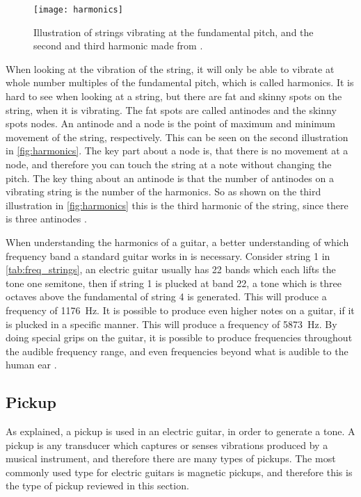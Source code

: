 \begin{figure}[H]
	\centering
	\texttt{[image: harmonics]}
	\caption{Illustration of strings vibrating at the fundamental pitch, and the second and third harmonic made from \citep{pickup}.}
	\label{fig:harmonics}
\end{figure}

When looking at the vibration of the string, it will only be able to vibrate at whole number multiples of the fundamental pitch, which is called harmonics. It is hard to see when looking at a string, but there are fat and skinny spots on the string, when it is vibrating. The fat spots are called antinodes and the skinny spots nodes. An antinode and a node is the point of maximum and minimum movement of the string, respectively. This can be seen on the second illustration in \autoref{fig:harmonics}. The key part about a node is, that there is no movement at a node, and therefore you can touch the string at a note without changing the pitch. The key thing about an antinode is that the number of antinodes on a vibrating string is the number of the harmonics. So as shown on the third illustration in \autoref{fig:harmonics} this is the third harmonic of the string, since there is three antinodes \citep{pickup}.

When understanding the harmonics of a guitar, a better understanding of which frequency band a standard guitar works in is necessary. Consider string 1 in \autoref{tab:freq_strings}, an electric guitar usually has 22 bands which each lifts the tone one semitone, then if string 1 is plucked at band 22, a tone which is three octaves above the fundamental of string 4 is generated. This will produce a frequency of \SI{1176}{\hertz}. It is possible to produce even higher notes on a guitar, if it is plucked in a specific manner. This will produce a frequency of \SI{5873}{\hertz}. By doing special grips on the guitar, it is possible to produce frequencies throughout the audible frequency range, and even frequencies beyond what is audible to the human ear \citep{high_note}. 

\subsection{Pickup}
As explained, a pickup is used in an electric guitar, in order to generate a tone. A pickup is any transducer which captures or senses vibrations produced by a musical instrument, and therefore there are many types of pickups. The most commonly used type for electric guitars is magnetic pickups, and therefore this is the type of pickup reviewed in this section.

